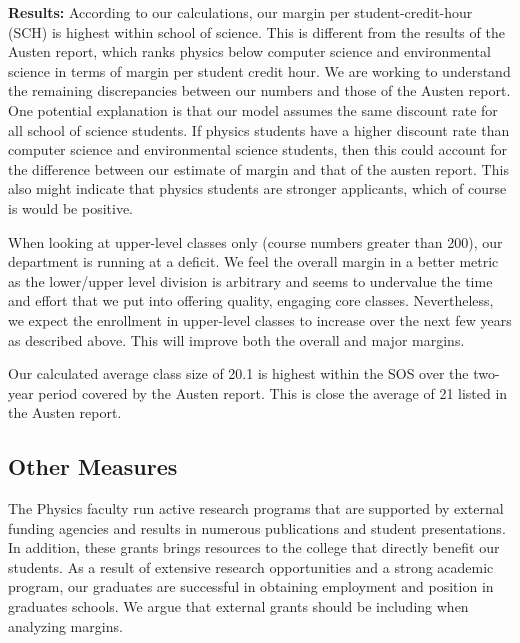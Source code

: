 \documentclass[12pt]{article}
\begin{document}
{\bf Results:  }
According to our calculations, our margin per student-credit-hour (SCH) is highest within school of science.  This is different from the results of the Austen report, which ranks physics below computer science and environmental science in terms of margin per student credit hour.  We are working to understand the remaining discrepancies between our numbers and those of the Austen report.  One potential explanation is that our model assumes the same discount rate for all school of science students.  If physics students have a higher discount rate than computer science and environmental science students, then this could account for the difference between our estimate of margin and that of the austen report.  This also might indicate that physics students are stronger applicants, which of course is would be positive.  


When looking at upper-level classes only (course numbers greater than 200), our department is running at a deficit.  We feel the overall margin in a better metric as the lower/upper level division is arbitrary and seems to undervalue the time and effort that we put into offering quality, engaging core classes.  Nevertheless, we expect the enrollment in upper-level classes to increase over the next few years as described above.  This will improve both the overall and major margins.  

Our calculated average class size of 20.1 is highest within the SOS over the two-year period covered by the Austen report.  This is close the average of 21 listed in the Austen report.



\subsection{Other Measures}

The Physics faculty run active research programs that are supported by external funding agencies and results in numerous publications and student presentations.  In addition, these grants brings resources to the college that directly benefit our students.  As a result of extensive research opportunities and a strong academic program, our graduates are successful in obtaining employment and position in graduates schools.  We argue that external grants should be including when analyzing margins.
\end{document}

